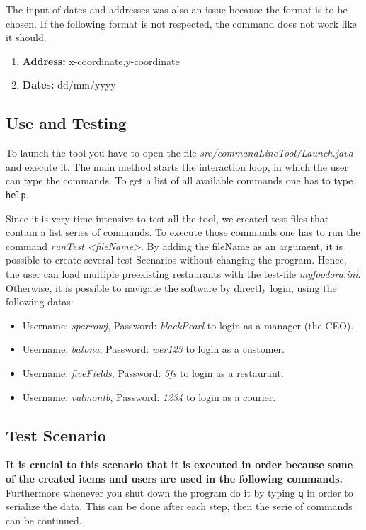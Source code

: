 The input of dates and addresses was also an issue because the format is to be chosen. If the 
following format is not respected, the command does not work like it should.
\begin{enumerate}
	\item \textbf{Address: } x-coordinate,y-coordinate
	\item \textbf{Dates: } dd/mm/yyyy
\end{enumerate}

\subsection{Use and Testing}
\label{sub:use_and_testing}

To launch the tool you have to open the file \textit{src/commandLineTool/Launch.java} and execute
it. The main method starts the interaction loop, in which the user can type the commands. To get
a list of all available commands one has to type \lstinline|help|. 

Since it is very time intensive to test all the tool, we created test-files that
contain a list series of commands. To execute those commands one has to run the command 
\textit{runTest <fileName>}. By adding the fileName as an argument, it is possible to create 
several test-Scenarios without changing the program. Hence, the user can load multiple 
preexisting restaurants with the test-file \textit{my\textunderscore foodora.ini}.
Otherwise, it is possible to navigate the software by directly login, using the following datas:
\begin{itemize}
	\item{}Username: \textit{sparrowj}, Password: \textit{blackPearl} to login as a manager (the CEO).
	\item{}Username: \textit{batona}, Password: \textit{wer123} to login as a customer.
	\item{}Username: \textit{fiveFields}, Password: \textit{5fs} to login as a restaurant.
	\item{}Username: \textit{valmontb}, Password: \textit{1234} to login as a courier.
\end{itemize}

\subsection{Test Scenario}
\label{sub:test_scenario}

\textbf{It is crucial to this scenario that it is executed in order because some of the created items and 
users are used in the following commands.} Furthermore whenever you shut down the program do it by
typing \lstinline|q| in order to serialize the data. This can be done after each step, then the 
serie of commands can be continued.

